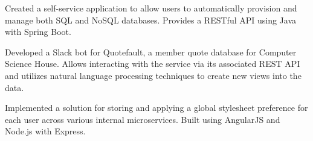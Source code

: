\documentclass[10pt,a4paper]{altacv}
\begin{document}
\divider

Created a self-service application to allow users to automatically provision and manage both SQL and NoSQL databases. Provides a RESTful API using Java with Spring Boot.

\divider

Developed a Slack bot for Quotefault, a member quote database for Computer Science House. Allows interacting with the service via its associated REST API and utilizes natural language processing techniques to create new views into the data.

\divider

Implemented a solution for storing and applying a global stylesheet preference for each user across various internal microservices. Built using AngularJS and Node.js with Express.

%

\clearpage
\end{document}
